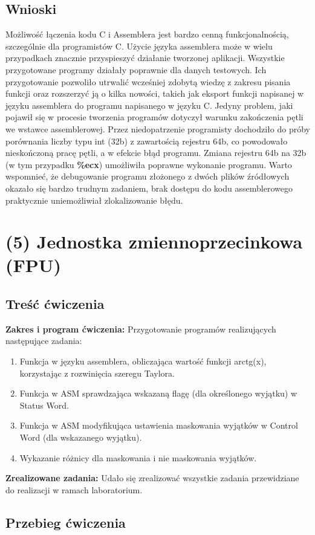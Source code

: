 \documentclass[a4paper,12pt]{article}
\begin{document}
\subsection{Wnioski}
Możliwość łączenia kodu C i Assemblera jest bardzo cenną funkcjonalnością, szczególnie dla programistów C. Użycie języka assemblera może w wielu przypadkach znacznie przyspieszyć działanie tworzonej aplikacji. Wszystkie przygotowane programy działały poprawnie dla danych testowych. Ich przygotowanie pozwoliło utrwalić wcześniej zdobytą wiedzę z zakresu pisania funkcji oraz rozszerzyć ją o kilka nowości, takich jak eksport funkcji napisanej w języku assemblera do programu napisanego w języku C. Jedyny problem, jaki pojawił się w procesie tworzenia programów dotyczył warunku zakończenia pętli we wstawce assemblerowej. Przez niedopatrzenie programisty dochodziło do próby porównania liczby typu int (32b) z zawartością rejestru 64b, co powodowało nieskończoną pracę pętli, a w efekcie błąd programu. Zmiana rejestru 64b na 32b (w tym przypadku \textbf{\%ecx}) umożliwiła poprawne wykonanie programu. Warto wspomnieć, że debugowanie programu złożonego z dwóch plików źródłowych okazało się bardzo trudnym zadaniem, brak dostępu do kodu assemblerowego praktycznie uniemożliwiał zlokalizowanie błędu.
\newpage  
\section{(5) Jednostka zmiennoprzecinkowa (FPU)}
\subsection{Treść ćwiczenia}
\textbf{Zakres i program ćwiczenia:}
Przygotowanie programów realizujących następujące zadania:
\begin{enumerate}
	\item Funkcja w języku assemblera, obliczająca wartość funkcji arctg(x), korzystając z rozwinięcia szeregu Taylora.
	\item Funkcja w ASM sprawdzająca wskazaną flagę (dla określonego wyjątku) w Status Word.
	\item Funkcja w ASM modyfikująca ustawienia maskowania wyjątków w Control Word (dla wskazanego wyjątku).
	\item Wykazanie różnicy dla maskowania i nie maskowania wyjątków.
\end{enumerate}
\textbf{Zrealizowane zadania:}
Udało się zrealizować wszystkie zadania przewidziane do realizacji w ramach laboratorium.
\subsection{Przebieg ćwiczenia}
\end{document}
